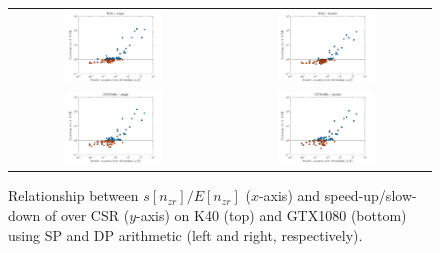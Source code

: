 \begin{figure}[t]
\begin{tabular}{cc}
\includegraphics[width=0.48\textwidth]{plots/std_speedup_K40_single.pdf} &
\includegraphics[width=0.48\textwidth]{plots/std_speedup_K40_double.pdf}\\
\includegraphics[width=0.48\textwidth]{plots/std_speedup_GTX1080_single.pdf} &
\includegraphics[width=0.48\textwidth]{plots/std_speedup_GTX1080_double.pdf}
\end{tabular}
\vspace*{-2ex}
\caption{Relationship between $s[n_{zr}]/E[n_{zr}]$ ($x$-axis)
    and speed-up/slow-down of \bcsr over CSR ($y$-axis)
    on K40 (top) and GTX1080 (bottom)
    using SP and DP arithmetic (left and right, respectively).}
\label{fig:deviation}
\end{figure}

